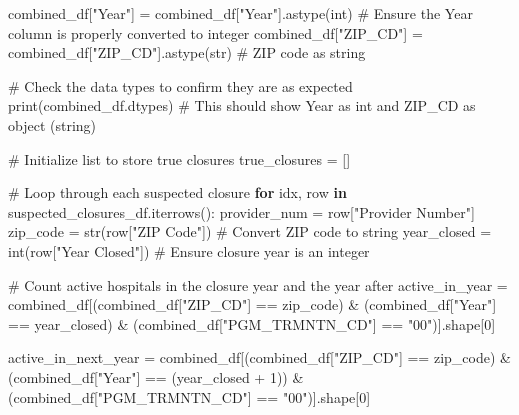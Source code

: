 \documentclass[
  letterpaper,
  DIV=11,
  numbers=noendperiod]{scrartcl}
\newenvironment{Shaded}{\begin{snugshade}}{\end{snugshade}}
\newcommand{\BuiltInTok}[1]{\textcolor[rgb]{0.00,0.23,0.31}{#1}}
\newcommand{\CommentTok}[1]{\textcolor[rgb]{0.37,0.37,0.37}{#1}}
\newcommand{\ControlFlowTok}[1]{\textcolor[rgb]{0.00,0.23,0.31}{\textbf{#1}}}
\newcommand{\DecValTok}[1]{\textcolor[rgb]{0.68,0.00,0.00}{#1}}
\newcommand{\KeywordTok}[1]{\textcolor[rgb]{0.00,0.23,0.31}{\textbf{#1}}}
\newcommand{\NormalTok}[1]{\textcolor[rgb]{0.00,0.23,0.31}{#1}}
\newcommand{\OperatorTok}[1]{\textcolor[rgb]{0.37,0.37,0.37}{#1}}
\newcommand{\StringTok}[1]{\textcolor[rgb]{0.13,0.47,0.30}{#1}}
\begin{document}
\begin{Shaded}
\begin{Highlighting}[]
\NormalTok{combined\_df[}\StringTok{"Year"}\NormalTok{] }\OperatorTok{=}\NormalTok{ combined\_df[}\StringTok{"Year"}\NormalTok{].astype(}\BuiltInTok{int}\NormalTok{) }\CommentTok{\# Ensure the Year column is properly converted to integer}
\NormalTok{combined\_df[}\StringTok{"ZIP\_CD"}\NormalTok{] }\OperatorTok{=}\NormalTok{ combined\_df[}\StringTok{"ZIP\_CD"}\NormalTok{].astype(}\BuiltInTok{str}\NormalTok{)  }\CommentTok{\# ZIP code as string}

\CommentTok{\# Check the data types to confirm they are as expected}
\BuiltInTok{print}\NormalTok{(combined\_df.dtypes)  }\CommentTok{\# This should show Year as int and ZIP\_CD as object (string)}

\CommentTok{\# Initialize list to store true closures}
\NormalTok{true\_closures }\OperatorTok{=}\NormalTok{ []}

\CommentTok{\# Loop through each suspected closure}
\ControlFlowTok{for}\NormalTok{ idx, row }\KeywordTok{in}\NormalTok{ suspected\_closures\_df.iterrows():}
\NormalTok{    provider\_num }\OperatorTok{=}\NormalTok{ row[}\StringTok{"Provider Number"}\NormalTok{]}
\NormalTok{    zip\_code }\OperatorTok{=} \BuiltInTok{str}\NormalTok{(row[}\StringTok{"ZIP Code"}\NormalTok{])  }\CommentTok{\# Convert ZIP code to string}
\NormalTok{    year\_closed }\OperatorTok{=} \BuiltInTok{int}\NormalTok{(row[}\StringTok{"Year Closed"}\NormalTok{])  }\CommentTok{\# Ensure closure year is an integer}
    
    \CommentTok{\# Count active hospitals in the closure year and the year after}
\NormalTok{    active\_in\_year }\OperatorTok{=}\NormalTok{ combined\_df[(combined\_df[}\StringTok{"ZIP\_CD"}\NormalTok{] }\OperatorTok{==}\NormalTok{ zip\_code) }\OperatorTok{\&} 
\NormalTok{                                 (combined\_df[}\StringTok{"Year"}\NormalTok{] }\OperatorTok{==}\NormalTok{ year\_closed) }\OperatorTok{\&} 
\NormalTok{                                 (combined\_df[}\StringTok{"PGM\_TRMNTN\_CD"}\NormalTok{] }\OperatorTok{==} \StringTok{"00"}\NormalTok{)].shape[}\DecValTok{0}\NormalTok{]}
    
\NormalTok{    active\_in\_next\_year }\OperatorTok{=}\NormalTok{ combined\_df[(combined\_df[}\StringTok{"ZIP\_CD"}\NormalTok{] }\OperatorTok{==}\NormalTok{ zip\_code) }\OperatorTok{\&} 
\NormalTok{                                      (combined\_df[}\StringTok{"Year"}\NormalTok{] }\OperatorTok{==}\NormalTok{ (year\_closed }\OperatorTok{+} \DecValTok{1}\NormalTok{)) }\OperatorTok{\&} 
\NormalTok{                                      (combined\_df[}\StringTok{"PGM\_TRMNTN\_CD"}\NormalTok{] }\OperatorTok{==} \StringTok{"00"}\NormalTok{)].shape[}\DecValTok{0}\NormalTok{]}
    

\end{Highlighting}
\end{Shaded}
\end{document}
